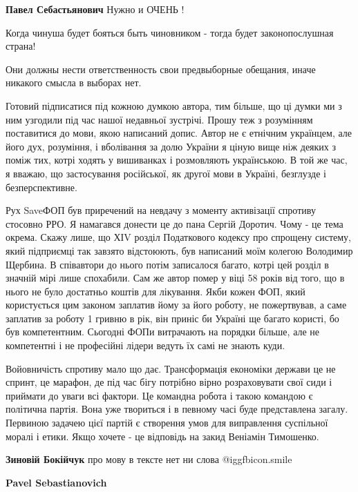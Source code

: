 \begin{itemize}
\begin{itemize}
\textbf{Павел Себастьянович} Нужно и ОЧЕНЬ !
\end{itemize} %

Когда чинуша будет бояться быть чиновником - тогда будет законопослушная страна!

Они должны нести ответственность свои предвыборные обещания, иначе никакого смысла в выборах нет.


Готовий підписатися під кожною думкою автора, тим більше, що ці думки ми з ним
узгодили під час нашої недавньої зустрічі. Прошу теж з розумінням поставитися
до мови, якою написаний допис. Автор не є етнічним українцем, але його дух,
розуміння, і вболівання за долю України я ціную вище ніж деяких з поміж тих,
котрі ходять у вишиванках і розмовляють українською. В той же час, я вважаю, що
застосування російської, як другої мови в Україні, безглузде і безперспективне.

Рух SaveФОП був приречений на невдачу з моменту активізації спротиву стосовно
РРО. Я намагався донести це до пана Сергій Доротич. Чому - це тема окрема.
Скажу лише, що ХІV розділ Податкового кодексу про спрощену систему, який
підприємці так завзято відстоюють, був написаний моїм колегою Володимир
Щербина. В співавтори до нього потім записалося багато, котрі цей розділ в
значній мірі лише спохабили. Сам же автор помер у віці 58 років від того, що в
нього не було достатньо коштів для лікування. Якби кожен ФОП, який користується
цим законом заплатив йому за його роботу, не пожертвував, а саме заплатив за
роботу 1 гривню в рік, він приніс би Україні ще багато користі, бо був
компетентним. Сьогодні ФОПи витрачають на порядки більше, але не компетентні і
не професійні лідери ведуть їх самі не знають куди.

Войовничість спротиву мало що дає. Трансформація економіки держави це не
спринт, це марафон, де під час бігу потрібно вірно розраховувати свої сиди і
приймати до уваги всі фактори. Це командна робота і такою командою є політична
партія. Вона уже твориться і в певному часі буде представлена загалу. Первиною
задачею цієї партій є створення умов для виправлення суспільної моралі і етики.
Якщо хочете - це відповідь на закид Веніамін Тимошенко.

\begin{itemize} %
\textbf{Зиновій Бокійчук} про мову в тексте нет ни слова  @igg{fbicon.smile} 

\textbf{Pavel Sebastianovich} 


\end{itemize}
\end{itemize}
